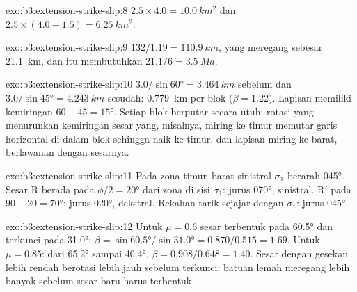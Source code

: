 \begin{solution}{exo:b3:extension-strike-slip:8}
$2.5\times4.0 = \qty{10.0}{km^2}$ dan $2.5\times(4.0 - 1.5) =
\qty{6.25}{km^2}$.
\end{solution}

\begin{solution}{exo:b3:extension-strike-slip:9}
$132/1.19 = \qty{110.9}{km}$, yang meregang sebesar \qty{21.1}{km}, dan itu
membutuhkan $21.1/6 = \qty{3.5}{Ma}$.
\end{solution}

\begin{solution}{exo:b3:extension-strike-slip:10}
$3.0/\sin\ang{60} = \qty{3.464}{km}$ sebelum dan $3.0/\sin\ang{45} =
\qty{4.243}{km}$ sesudah: \qty{0.779}{km} per blok ($\beta = 1.22$). Lapisan
memiliki kemiringan $60 - 45 = \ang{15}$. Setiap blok berputar secara utuh:
rotasi yang menurunkan kemiringan sesar yang, misalnya, miring ke timur
memutar garis horizontal di dalam blok sehingga naik ke timur, dan lapisan
miring ke barat, berlawanan dengan sesarnya.
\end{solution}

\begin{solution}{exo:b3:extension-strike-slip:11}
Pada zona timur--barat sinistral $\sigma_1$ berarah \ang{045}. Sesar R berada
pada $\phi/2 = \ang{20}$ dari zona di sisi $\sigma_1$: jurus \ang{070},
sinistral. R$'$ pada $90 - 20 = \ang{70}$: jurus \ang{020}, dekstral. Rekahan
tarik sejajar dengan $\sigma_1$: jurus \ang{045}.
\end{solution}

\begin{solution}{exo:b3:extension-strike-slip:12}
Untuk $\mu = 0.6$ sesar terbentuk pada \ang{60.5} dan terkunci pada \ang{31.0}: $\beta =
\sin\ang{60.5}/\sin\ang{31.0} = 0.870/0.515 = 1.69$. Untuk $\mu = 0.85$: dari
\ang{65.2} sampai \ang{40.4}, $\beta = 0.908/0.648 = 1.40$. Sesar dengan gesekan
lebih rendah berotasi lebih jauh sebelum terkunci: batuan lemah meregang lebih
banyak sebelum sesar baru harus terbentuk.
\end{solution}

